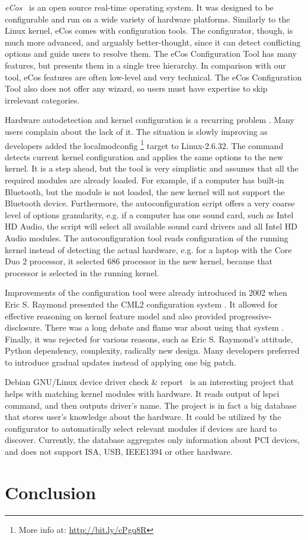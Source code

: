 \documentclass{chi2009}
\begin{document}
\textit{eCos}~\cite{veer:ecos:2000} is an open source real-time operating system. It was designed to be configurable and run on a wide variety of hardware platforms. Similarly to the Linux kernel, eCos comes with configuration tools. The configurator, though, is much more advanced, and arguably better-thought, since it can detect conflicting options and guide users to resolve them. The eCos Configuration Tool has many features, but presents them in a single tree hierarchy. In comparison with our tool, eCos features are often low-level and very technical. The eCos Configuration Tool also does not offer any wizard, so users must have expertise to skip irrelevant categories.

Hardware autodetection and kernel configuration is a recurring problem \cite{debian:config:2010,soft32:config:2007}. Many users complain about the lack of it. The situation is slowly improving as developers added the \textsf{localmodconfig} \footnote{More info at: \url{http://bit.ly/cPgq8R}} target to Linux-2.6.32. The command detects current kernel configuration and applies the same options to the new kernel. It is a step ahead, but the tool is very simplistic and assumes that all the required modules are already loaded. For example, if a computer has built-in Bluetooth, but the module is not loaded, the new kernel will not support the Bluetooth device. Furthermore, the autoconfiguration script offers a very coarse level of options granularity, e.g. if a computer has one sound card, such as Intel HD Audio, the script will select all available sound card drivers and all Intel HD Audio modules. The autoconfiguration tool reads configuration of the running kernel instead of detecting the actual hardware, e.g. for a laptop with the Core Duo 2 processor, it selected 686 processor in the new kernel, because that processor is selected in the running kernel.

Improvements of the configuration tool were already introduced in 2002 when Eric S. Raymond presented the CML2 configuration system \cite{raymond:cml2:2000}. It allowed for effective reasoning on kernel feature model and also provided progressive-disclosure. There was a long debate and flame war about using that system \cite{kerneltrap:linux:2002}. Finally, it was rejected for various reasons, such as Eric S. Raymond's attitude, Python dependency, complexity, radically new design. Many developers preferred to introduce gradual updates instead of applying one big patch.

Debian GNU/Linux device driver check \& report~\cite{muto:check:2010} is an interesting project that helps with matching kernel modules with hardware. It reads output of \textsf{lspci} command, and then outputs driver's name. The project is in fact a big database that stores user's knowledge about the hardware. It could be utilized by the configurator to automatically select relevant modules if devices are hard to discover. Currently, the database aggregates only information about PCI devices, and does not support ISA, USB, IEEE1394 or other hardware.

\section{Conclusion}\label{sec:conclusion}



\end{document}
